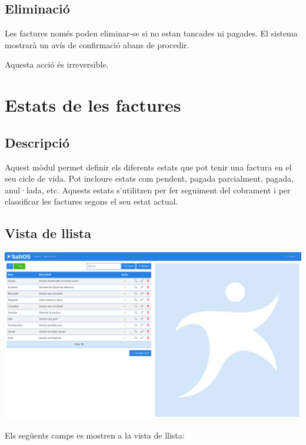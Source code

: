\documentclass[a4paper]{article}
\begin{document}
\hypertarget{toc140}{}
\subsection{Eliminació}

Les factures només poden eliminar-se si no estan tancades ni pagades.
El sistema mostrarà un avís de confirmació abans de procedir.

Aquesta acció és irreversible.


\hypertarget{toc141}{}
\section{Estats de les factures}

\hypertarget{toc142}{}
\subsection{Descripció}

Aquest mòdul permet definir els diferents estats que pot tenir una factura en el seu cicle de vida.
Pot incloure estats com pendent, pagada parcialment, pagada, anul·lada, etc.
Aquests estats s’utilitzen per fer seguiment del cobrament i per classificar les factures segons el seu estat actual.

\hypertarget{toc143}{}
\subsection{Vista de llista}

\begin{center}\includegraphics[width=1\textwidth]{../ujest/snaps/test-screenshots-js-screenshots-sales-invoices-status-list-ca-es-1-snap.png}\end{center}

Els següents camps es mostren a la vista de llista:
\end{document}
